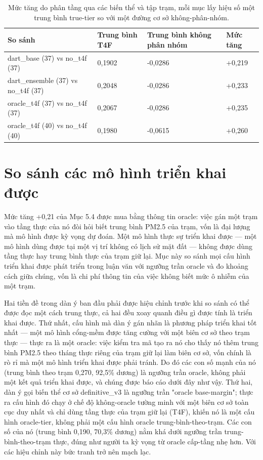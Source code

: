 {\small
\begin{longtable}{llll}
\caption{Mức tăng do phân tầng qua các biến thể và tập trạm, mỗi mục lấy hiệu số một trung bình true-tier so với một đường cơ sở không-phân-nhóm.}\\
\toprule
\textbf{So sánh} & \textbf{Trung bình T4F} & \textbf{Trung bình không phân nhóm} & \textbf{Mức tăng} \\
\midrule\endhead
dart\_base (37) vs no\_t4f (37) & 0,1902 & -0,0286 & +0,219 \\
dart\_ensemble (37) vs no\_t4f (37) & 0,2048 & -0,0286 & +0,233 \\
oracle\_t4f (37) vs no\_t4f (37) & 0,2067 & -0,0286 & +0,235 \\
oracle\_t4f (40) vs no\_t4f (40) & 0,1980 & -0,0615 & +0,260 \\
\bottomrule
\end{longtable}
}


\section{So sánh các mô hình triển khai được}

Mức tăng +0,21 của Mục 5.4 được mua bằng thông tin oracle: việc gán một trạm vào tầng thực của nó đòi hỏi biết trung bình PM2.5 của trạm, vốn là đại lượng mà mô hình được kỳ vọng dự đoán. Một mô hình thực sự triển khai được --- một mô hình dùng được tại một vị trí không có lịch sử mặt đất --- không được dùng tầng thực hay trung bình thực của trạm giữ lại. Mục này so sánh mọi cấu hình triển khai được phát triển trong luận văn với ngưỡng trần oracle và đo khoảng cách giữa chúng, vốn là chi phí thông tin của việc không biết mức ô nhiễm của một trạm.

Hai tiền đề trong dàn ý ban đầu phải được hiệu chỉnh trước khi so sánh có thể được đọc một cách trung thực, cả hai đều xoay quanh điều gì được tính là triển khai được. Thứ nhất, cấu hình mà dàn ý gán nhãn là phương pháp triển khai tốt nhất --- một mô hình cổng-mềm được tăng cường với một biên cơ sở theo trạm thực --- thực ra là một oracle: việc kiểm tra mã tạo ra nó cho thấy nó thêm trung bình PM2.5 theo tháng thực riêng của trạm giữ lại làm biên cơ sở, vốn chính là rò rỉ mà một mô hình triển khai được phải tránh. Do đó các con số mạnh của nó (trung bình theo trạm 0,270, 92,5\% dương) là ngưỡng trần oracle, không phải một kết quả triển khai được, và chúng được báo cáo dưới đây như vậy. Thứ hai, dàn ý gọi biến thể cơ sở definitive\_v3 là ngưỡng trần "oracle base-margin"; thực ra cấu hình đó chạy ở chế độ không-oracle tường minh với một biên cơ sở toàn cục duy nhất và chỉ dùng tầng thực của trạm giữ lại (T4F), khiến nó là một cấu hình oracle-tier, không phải một cấu hình oracle trung-bình-theo-trạm. Các con số của nó (trung bình 0,190, 70,3\% dương) nằm khá dưới ngưỡng trần trung-bình-theo-trạm thực, đúng như người ta kỳ vọng từ oracle cấp-tầng nhẹ hơn. Với các hiệu chỉnh này bức tranh trở nên mạch lạc.

